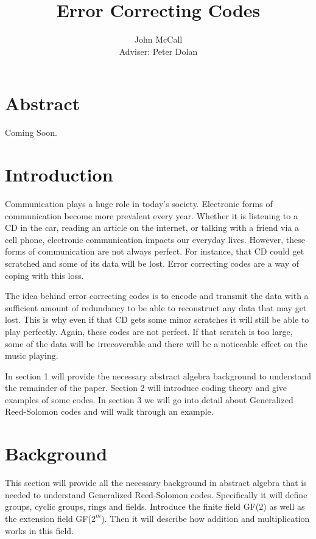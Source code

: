 \documentclass{article}
\title{Error Correcting Codes}
\author{John McCall\\Adviser: Peter Dolan}
\begin{document}

\maketitle

\section{Abstract}
Coming Soon.

\section{Introduction}
Communication plays a huge role in today's society. Electronic forms of communication become more prevalent every year. Whether it is listening to a CD in the car, reading an article on the internet, or talking with a friend via a cell phone, electronic communication impacts our everyday lives. However, these forms of communication are not always perfect. For instance, that CD could get scratched and some of its data will be lost. Error correcting codes are a way of coping with this loss. 

The idea behind error correcting codes is to encode and transmit the data with a sufficient amount of redundancy to be able to reconstruct any data that may get lost. This is why even if that CD gets some minor scratches it will still be able to play perfectly. Again, these codes are not perfect. If that scratch is too large, some of the data will be irrecoverable and there will be a noticeable effect on the music playing.

In section 1 will provide the necessary abstract algebra background to understand the remainder of the paper. Section 2 will introduce coding theory and give examples of some codes. In section 3 we will go into detail about Generalized Reed-Solomon codes and will walk through an example.

\section{Background}
This section will provide all the necessary background in abstract algebra that is needed to understand Generalized Reed-Solomon codes. Specifically it will define groups, cyclic groups, rings and fields. Introduce the finite field GF(2) as well as the extension field GF($2^{m}$). Then it will describe how addition and multiplication works in this field.
\end{document}
